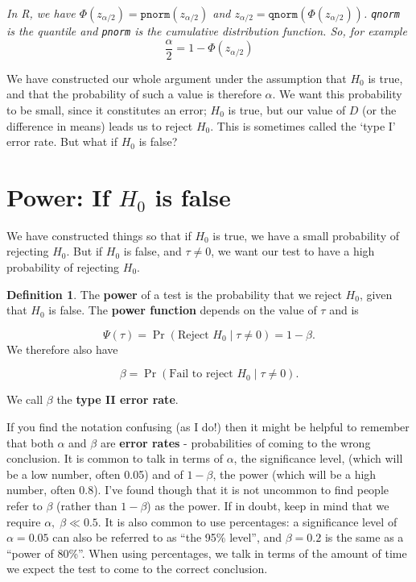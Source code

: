 \documentclass[
  openany]{book}
\theoremstyle{definition}
\newtheorem{definition}{Definition}[chapter]
\theoremstyle{definition}
\theoremstyle{definition}
\theoremstyle{definition}
\theoremstyle{remark}
\begin{document}
\emph{In R, we have \(\Phi\left(z_{\alpha/2}\right) = \texttt{pnorm}\left(z_{\alpha/2}\right)\) and \(z_{\alpha/2} = \texttt{qnorm}\left(\Phi\left(z_{\alpha/2}\right)\right)\). \texttt{qnorm} is the quantile and \texttt{pnorm} is the cumulative distribution function. So, for example}
\[\frac{\alpha}{2} = 1 - \Phi\left(z_{\alpha/2}\right)\]

We have constructed our whole argument under the assumption that \(H_0\) is true, and that the probability of such a value is therefore \(\alpha\). We want this probability to be small, since it constitutes an error; \(H_0\) is true, but our value of \(D\) (or the difference in means) leads us to reject \(H_0\). This is sometimes called the `type I' error rate. But what if \(H_0\) is false?

\section{\texorpdfstring{Power: If \(H_0\) is false}{Power: If H\_0 is false}}\label{sec-power}

We have constructed things so that if \(H_0\) is true, we have a small probability of rejecting \(H_0\). But if \(H_0\) is false, and \(\tau\neq{0}\), we want our test to have a high probability of rejecting \(H_0\).

\begin{definition}
The \textbf{power} of a test is the probability that we reject \(H_0\), given that \(H_0\) is false. The \textbf{power function} depends on the value of \(\tau\) and is

\[\Psi\left(\tau\right) = \Pr\left(\text{Reject } H_0\mid{\tau\neq{0}}\right) = 1 - \beta.\]
We therefore also have

\[\beta = \Pr\left(\text{Fail to reject } H_0\mid{\tau\neq{0}}\right). \]

We call \(\beta\) the \textbf{type II error rate}.
\end{definition}

If you find the notation confusing (as I do!) then it might be helpful to remember that both \(\alpha\) and \(\beta\) are \textbf{error rates} - probabilities of coming to the wrong conclusion. It is common to talk in terms of \(\alpha\), the significance level, (which will be a low number, often 0.05) and of \(1-\beta\), the power (which will be a high number, often 0.8). I've found though that it is not uncommon to find people refer to \(\beta\) (rather than \(1-\beta\)) as the power. If in doubt, keep in mind that we require \(\alpha,\;\beta \ll 0.5\). It is also common to use percentages: a significance level of \(\alpha=0.05\) can also be referred to as ``the 95\% level'', and \(\beta=0.2\) is the same as a ``power of 80\%''. When using percentages, we talk in terms of the amount of time we expect the test to come to the correct conclusion.
\end{document}

